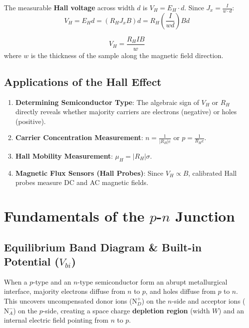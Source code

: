 The measurable \textbf{Hall voltage} across width $d$ is $V_H = E_H \cdot d$. Since $J_x = \frac{I}{w \cdot d}$:
\begin{equation}
    V_H = E_H d = (R_H J_x B) d = R_H \left(\frac{I}{w d}\right) B d
\end{equation}

\begin{keyequation}
\begin{equation}
    V_H = \frac{R_H I B}{w}
\end{equation}
where $w$ is the thickness of the sample along the magnetic field direction.
\end{keyequation}

\subsection{Applications of the Hall Effect}
\begin{enumerate}
    \item \textbf{Determining Semiconductor Type}: The algebraic sign of $V_H$ or $R_H$ directly reveals whether majority carriers are electrons (negative) or holes (positive).
    \item \textbf{Carrier Concentration Measurement}: $n = \frac{1}{|R_H| e}$ or $p = \frac{1}{R_H e}$.
    \item \textbf{Hall Mobility Measurement}: $\mu_H = |R_H| \sigma$.
    \item \textbf{Magnetic Flux Sensors (Hall Probes)}: Since $V_H \propto B$, calibrated Hall probes measure DC and AC magnetic fields.
\end{enumerate}

\section{Fundamentals of the \texorpdfstring{$p$-$n$}{p-n} Junction}

\subsection{Equilibrium Band Diagram \& Built-in Potential (\texorpdfstring{$V_{bi}$}{Vbi})}
When a $p$-type and an $n$-type semiconductor form an abrupt metallurgical interface, majority electrons diffuse from $n$ to $p$, and holes diffuse from $p$ to $n$. This uncovers uncompensated donor ions ($\text{N}_D^+$) on the $n$-side and acceptor ions ($\text{N}_A^-$) on the $p$-side, creating a space charge \textbf{depletion region} (width $W$) and an internal electric field pointing from $n$ to $p$.

